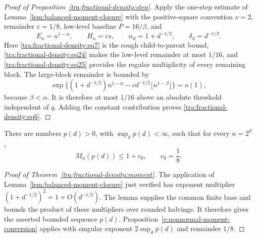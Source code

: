 \begin{proof}[Proof of Proposition~\ref{tra:fractional-density:step}]
\label{tra:fractional-density:large-dimension-trace-attenuation}
Apply the one-step estimate of Lemma~\ref{lem:balanced-moment-closure}
with the positive-square convention $\nu=2$, remainder $\varepsilon=1/8$,
low-level baseline $P=16/\beta$, and
\[
 E_n=n^{1-\alpha},\qquad H_n=cs,\qquad
 \alpha_d=1+d^{-1/2},\qquad\delta_d=d^{-1/2}.
\]
Here \eqref{tra:fractional-density:eq7} is the rough child-to-parent
bound, \eqref{tra:fractional-density:eq24} makes the low-level
remainder at most $1/16$, and \eqref{tra:fractional-density:eq25}
provides the regular multiplicity of every remaining block. The
large-block remainder is bounded by
\[
 \exp\{(1+d^{-1/2})n^{1-\alpha}
               -c d^{-1/2}\lfloor n^{1-\beta}\rfloor\}=o(1),
\]
because $\beta<\alpha$. It is therefore at most $1/16$ above an
absolute threshold independent of $q$. Adding the constant contribution
proves \eqref{tra:fractional-density:eq6}.

\end{proof}

\begin{theorem}\label{tra:fractional-density:moment}

\label{tra:fractional-density:bounded-moment-conclusion}
There are numbers \(p(d)>0\), with \(\sup_d p(d)<\infty\), such that for every \(n=2^d\),
\begin{equation}
 M_n(p(d))\le 1+c_0,\qquad c_0=\frac18.
 \label{tra:fractional-density:eq2}
\end{equation}

\end{theorem}
\begin{proof}[Proof of Theorem~\ref{tra:fractional-density:moment}]

\label{tra:fractional-density:finite-base-and-bounded-order}
The application of Lemma~\ref{lem:balanced-moment-closure} just
verified has exponent multiplier
$(1+d^{-1/2})^2=1+O(d^{-1/2})$. The lemma supplies the common finite
base and bounds the product of these multipliers over rounded
halvings. It therefore gives the asserted bounded sequence $p(d)$.
Proposition~\ref{e:nonnormal-moment-conversion} applies with singular
exponent $2\sup_dp(d)$ and remainder $1/8$.

\end{proof}
